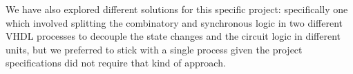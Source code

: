 \documentclass[12pt,a4paper]{article}
\begin{document}
        We have also explored different solutions for this specific project: specifically one which involved splitting the combinatory and synchronous logic in two different VHDL processes to decouple the state changes and the circuit logic in different units, but we preferred to stick with a single process given the project specifications did not require that kind of approach.
\end{document}
